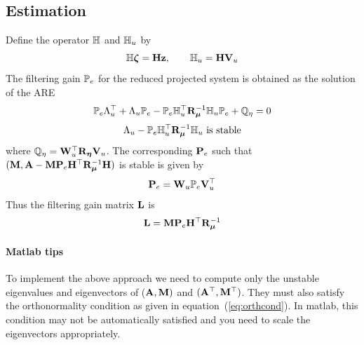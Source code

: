 \documentclass[12pt]{article}
\begin{document}
\subsection{Estimation}
Define the operator $\mathbb{H}$ and $\mathbb{H}_u$ by
\[
 \mathbb{H} \boldsymbol{\zeta} = {\mathbf H} {\mathbf z}, \qquad \mathbb{H}_u = {\mathbf H} {\mathbf V}_u
\]
The filtering gain $\mathbb{P}_e$ for the reduced projected system is obtained as the solution of the ARE
\[
 \mathbb{P}_e \Lambda_u^\top + \Lambda_u \mathbb{P}_e - \mathbb{P}_e \mathbb{H}_u^\top {\mathbf R}_{\boldsymbol\mu}^{-1} \mathbb{H}_u \mathbb{P}_e + \mathbb{Q}_\eta = 0
\]
\[
 \Lambda_u - \mathbb{P}_e \mathbb{H}_u^\top {\mathbf R}_{\boldsymbol\mu}^{-1} \mathbb{H}_u \text{ is stable} 
\]
where $\mathbb{Q}_\eta = {\mathbf W}_u^\top {\mathbf R}_{\boldsymbol\eta} {\mathbf V}_u$. The corresponding ${\mathbf P}_e$ such that $({\mathbf M},{\mathbf A} - {\mathbf M} {\mathbf P}_e {\mathbf H}^\top {\mathbf R}_{\boldsymbol\mu}^{-1} {\mathbf H})$ is stable is given by
\[
 {\mathbf P}_e = {\mathbf W}_u \mathbb{P}_e {\mathbf V}_u^\top
\]
Thus the filtering gain matrix ${\mathbf L}$ is
\[
 {\mathbf L} = {\mathbf M} {\mathbf P}_e {\mathbf H}^\top {\mathbf R}_{\boldsymbol\mu}^{-1}
\]
\paragraph{Matlab tips}
To implement the above approach we need to compute only the unstable eigenvalues and eigenvectors of (${\mathbf A},{\mathbf M})$ and $({\mathbf A}^\top,{\mathbf M}^\top)$. They must also satisfy the orthonormality condition as given in equation~(\ref{eq:orthcond}). In matlab, this condition may not be automatically satisfied and you need to scale the eigenvectors appropriately.
\end{document}
